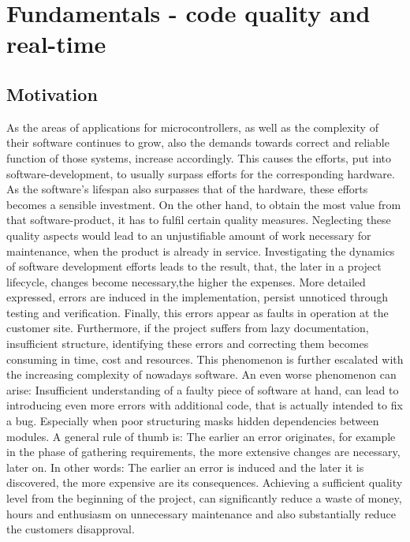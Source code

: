 \chapter{Fundamentals - code quality and real-time}
\label{cha:Fundamentals}
	\section{Motivation}
As the areas of applications for microcontrollers, as well as the complexity of their software continues to grow, also the demands towards correct and reliable function of those systems, increase accordingly. This causes the efforts, put into software-development, to usually surpass efforts for the corresponding hardware. As the software's lifespan also surpasses that of the hardware, these efforts becomes a sensible investment. On the other hand, to obtain the most value from that software-product, it has to fulfil certain quality measures. Neglecting these quality aspects would lead to an unjustifiable amount of work necessary for maintenance, when the product is already in service. Investigating the dynamics of software development efforts leads to the result, that, the later in a project lifecycle, changes become necessary,the higher the expenses. More detailed expressed, errors are induced in the implementation, persist unnoticed through testing and verification. Finally, this errors appear as faults in operation at the customer site. Furthermore, if the project suffers from lazy documentation, insufficient structure, identifying these errors and correcting them becomes consuming in time, cost and resources. This phenomenon is further escalated with the increasing complexity of nowadays software. An even worse phenomenon can arise: Insufficient understanding of a faulty piece of software at hand, can lead to introducing even more errors with additional code, that is actually intended to fix a bug. Especially when poor structuring masks hidden dependencies between modules. A general rule of thumb is: The earlier an error originates, for example in the phase of gathering requirements, the more extensive changes are necessary, later on. In other words: The earlier an error is induced and the later it is discovered, the more expensive are its consequences. Achieving a sufficient quality level from the beginning of the project, can significantly reduce a waste of money, hours and enthusiasm on unnecessary maintenance and also substantially reduce the customers disapproval.

